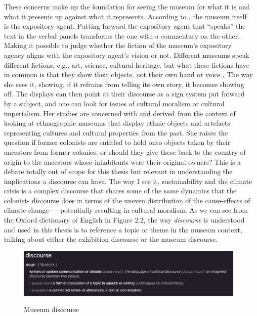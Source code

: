 These concerns make up the foundation for seeing the museum for what it is and what it presents up against what it represents. According to \autocite{Miekebal_book}, the museum itself is the expository agent. Putting forward the expository agent that “speaks” the text in the verbal panels transforms the one with a commentary on the other. Making it possible to judge whether the fiction of the museum's expository agency aligns with the expository agent's vision or not. Different museums speak different fictions, e.g., art, science, cultural heritage, but what these fictions have in common is that they show their objects, not their own hand or voice \autocite{Miekebal_book}. The way she sees it, showing, if it refrains from telling its own story, it becomes showing off. The displays can then point at their discourse as a sign system put forward by a subject, and one can look for issues of cultural moralism or cultural imperialism. Her studies are concerned with and derived from the context of looking at ethnographic museums that display ethnic objects and artefacts representing cultures and cultural properties from the past. She raises the question if former colonists are entitled to hold onto objects taken by their ancestors from former colonies, or should they give these back to the country of origin to the ancestors whose inhabitants were their original owners? This is a debate totally out of scope for this thesis but relevant in understanding the implications a discourse can have. The way I see it, sustainability and the climate crisis is a complex discourse that shares some of the same dynamics that the colonist- discourse does in terms of the uneven distribution of the cause-effects of climate change — potentially resulting in cultural moralism. As we can see from the Oxford dictionary of English in Figure 2.2, the way \emph{discourse} is understood and used in this thesis is to reference a topic or theme in the museum context, talking about either the exhibition discourse or the museum discourse.

\begin{figure}[H]
\includegraphics[width=12.5cm]{pictures/background/discourse.png}
\caption{Museum discourse}{\autocite{Oxford_dictionary}}
\centering
\end{figure}
 
